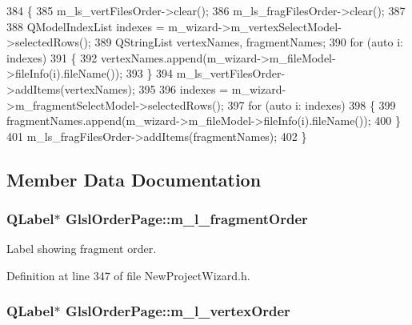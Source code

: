 \begin{DoxyCode}
384 \{
385   m_ls_vertFilesOrder->clear();
386   m_ls_fragFilesOrder->clear();
387 
388   QModelIndexList indexes = m_wizard->m_vertexSelectModel->selectedRows();
389   QStringList vertexNames, fragmentNames;
390   \textcolor{keywordflow}{for} (\textcolor{keyword}{auto} i: indexes)
391   \{
392     vertexNames.append(m_wizard->m_fileModel->fileInfo(i).fileName());
393   \}
394   m_ls_vertFilesOrder->addItems(vertexNames);
395 
396   indexes = m_wizard->m_fragmentSelectModel->selectedRows();
397   \textcolor{keywordflow}{for} (\textcolor{keyword}{auto} i: indexes)
398   \{
399     fragmentNames.append(m_wizard->m_fileModel->fileInfo(i).fileName());
400   \}
401   m_ls_fragFilesOrder->addItems(fragmentNames);
402 \}
\end{DoxyCode}


\subsection{Member Data Documentation}
\subsubsection[{m\-\_\-l\-\_\-fragment\-Order}]{\setlength{\rightskip}{0pt plus 5cm}Q\-Label$\ast$ Glsl\-Order\-Page\-::m\-\_\-l\-\_\-fragment\-Order\hspace{0.3cm}{\ttfamily [private]}}\label{class_glsl_order_page_a6470696df3b64e551fa558b4c421d938}


Label showing fragment order. 



Definition at line 347 of file New\-Project\-Wizard.\-h.

\subsubsection[{m\-\_\-l\-\_\-vertex\-Order}]{\setlength{\rightskip}{0pt plus 5cm}Q\-Label$\ast$ Glsl\-Order\-Page\-::m\-\_\-l\-\_\-vertex\-Order\hspace{0.3cm}{\ttfamily [private]}}\label{class_glsl_order_page_a3a353d35ca8d4c8009c079fea4edde61}


